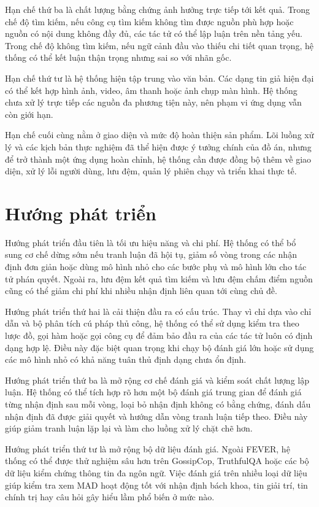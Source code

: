 ﻿\documentclass[oneside,a4paper,12pt]{extreport}
\begin{document}
Hạn chế thứ ba là chất lượng bằng chứng ảnh hưởng trực tiếp tới kết quả. Trong chế độ tìm kiếm, nếu công cụ tìm kiếm không tìm được nguồn phù hợp hoặc nguồn có nội dung không đầy đủ, các tác tử có thể lập luận trên nền tảng yếu. Trong chế độ không tìm kiếm, nếu ngữ cảnh đầu vào thiếu chi tiết quan trọng, hệ thống có thể kết luận thận trọng nhưng sai so với nhãn gốc.

Hạn chế thứ tư là hệ thống hiện tập trung vào văn bản. Các dạng tin giả hiện đại có thể kết hợp hình ảnh, video, âm thanh hoặc ảnh chụp màn hình. Hệ thống chưa xử lý trực tiếp các nguồn đa phương tiện này, nên phạm vi ứng dụng vẫn còn giới hạn.

Hạn chế cuối cùng nằm ở giao diện và mức độ hoàn thiện sản phẩm. Lõi luồng xử lý và các kịch bản thực nghiệm đã thể hiện được ý tưởng chính của đồ án, nhưng để trở thành một ứng dụng hoàn chỉnh, hệ thống cần được đồng bộ thêm về giao diện, xử lý lỗi người dùng, lưu đệm, quản lý phiên chạy và triển khai thực tế.

\section{Hướng phát triển}

Hướng phát triển đầu tiên là tối ưu hiệu năng và chi phí. Hệ thống có thể bổ sung cơ chế dừng sớm nếu tranh luận đã hội tụ, giảm số vòng trong các nhận định đơn giản hoặc dùng mô hình nhỏ cho các bước phụ và mô hình lớn cho tác tử phán quyết. Ngoài ra, lưu đệm kết quả tìm kiếm và lưu đệm chấm điểm nguồn cũng có thể giảm chi phí khi nhiều nhận định liên quan tới cùng chủ đề.

Hướng phát triển thứ hai là cải thiện đầu ra có cấu trúc. Thay vì chỉ dựa vào chỉ dẫn và bộ phân tích cú pháp thủ công, hệ thống có thể sử dụng kiểm tra theo lược đồ, gọi hàm hoặc gọi công cụ để đảm bảo đầu ra của các tác tử luôn có định dạng hợp lệ. Điều này đặc biệt quan trọng khi chạy bộ đánh giá lớn hoặc sử dụng các mô hình nhỏ có khả năng tuân thủ định dạng chưa ổn định.

Hướng phát triển thứ ba là mở rộng cơ chế đánh giá và kiểm soát chất lượng lập luận. Hệ thống có thể tích hợp rõ hơn một bộ đánh giá trung gian để đánh giá từng nhận định sau mỗi vòng, loại bỏ nhận định không có bằng chứng, đánh dấu nhận định đã được giải quyết và hướng dẫn vòng tranh luận tiếp theo. Điều này giúp giảm tranh luận lặp lại và làm cho luồng xử lý chặt chẽ hơn.

Hướng phát triển thứ tư là mở rộng bộ dữ liệu đánh giá. Ngoài FEVER, hệ thống có thể được thử nghiệm sâu hơn trên GossipCop, TruthfulQA hoặc các bộ dữ liệu kiểm chứng thông tin đa ngôn ngữ. Việc đánh giá trên nhiều loại dữ liệu giúp kiểm tra xem MAD hoạt động tốt với nhận định bách khoa, tin giải trí, tin chính trị hay câu hỏi gây hiểu lầm phổ biến ở mức nào.
\end{document}

